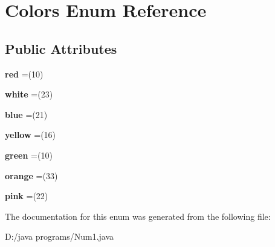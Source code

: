 \hypertarget{enum_colors}{}\section{Colors Enum Reference}
\label{enum_colors}
\subsection*{Public Attributes}
\begin{DoxyCompactItemize}
\item 
\mbox{\label{enum_colors_ab542a7f599cfa1641205039d0d940ed6}} 
{\bfseries red} =(10)
\item 
\mbox{\label{enum_colors_a53c4dd121d11794abf4bbe9444ad154d}} 
{\bfseries white} =(23)
\item 
\mbox{\label{enum_colors_a441d017c60deb7437cf549377803d6b5}} 
{\bfseries blue} =(21)
\item 
\mbox{\label{enum_colors_a7235833b6a139dcec36275ed2b7114cd}} 
{\bfseries yellow} =(16)
\item 
\mbox{\label{enum_colors_a3818eff6dc621c7402425ff20f486a91}} 
{\bfseries green} =(10)
\item 
\mbox{\label{enum_colors_a73a30964cfcc607d91dc9cebf6ec25b6}} 
{\bfseries orange} =(33)
\item 
\mbox{\label{enum_colors_a3f81f37c6a562777bb541eba36c6b5be}} 
{\bfseries pink} =(22)
\end{DoxyCompactItemize}


The documentation for this enum was generated from the following file\+:\begin{DoxyCompactItemize}
\item 
D\+:/java programs/Num1.\+java\end{DoxyCompactItemize}
